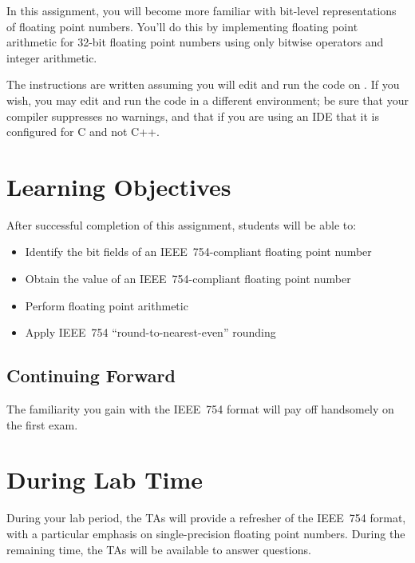 In this assignment, you will become more familiar with bit-level representations of floating point numbers.
You'll do this by implementing floating point arithmetic for 32-bit floating point numbers using only bitwise operators and integer arithmetic.

The instructions are written assuming you will edit and run the code on \runtimeenvironment.
If you wish, you may edit and run the code in a different environment;
be sure that your compiler suppresses no warnings, and that if you are using an IDE that it is configured for C and not C++.

\section*{Learning Objectives}

After successful completion of this assignment, students will be able to:
\begin{itemize}
    \item Identify the bit fields of an IEEE~754-compliant floating point number
    \item Obtain the value of an IEEE~754-compliant floating point number
    \item Perform floating point arithmetic
    \item Apply IEEE~754 ``round-to-nearest-even'' rounding
\end{itemize}

\subsection*{Continuing Forward}

The familiarity you gain with the IEEE~754 format will pay off handsomely on the first exam.

\section*{During Lab Time}

During your lab period, the TAs will provide a refresher of the IEEE~754 format, with a particular emphasis on single-precision floating point numbers.
During the remaining time, the TAs will be available to answer questions.

